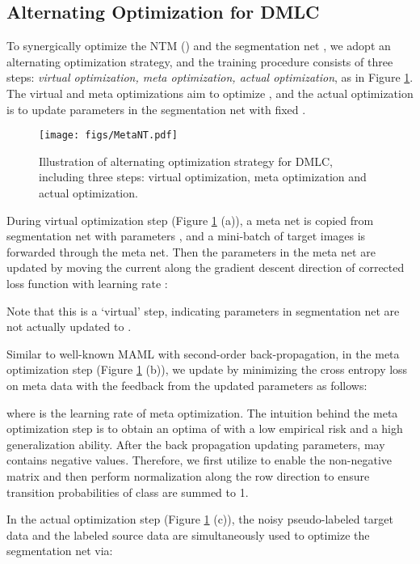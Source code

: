 \documentclass[final]{cvpr}
\begin{document}
\subsection{Alternating Optimization for DMLC}
To synergically optimize the NTM () and the segmentation net , we adopt an alternating optimization strategy, and the training procedure consists of three steps: \textit{virtual optimization, meta optimization, actual optimization}, as in Figure \ref{fig:MetaNT}. The virtual and meta optimizations aim to optimize , and the actual optimization is to update parameters in the segmentation net with fixed . 

\begin{figure}[t]
\centering
\texttt{[image: figs/MetaNT.pdf]}
\caption{Illustration of alternating optimization strategy for DMLC, including three steps: virtual optimization, meta optimization and actual optimization. }
\label{fig:MetaNT}
\vspace{-0.2cm}
\end{figure}

During virtual optimization step (Figure \ref{fig:MetaNT} (a)), a meta net is copied from segmentation net with parameters , and a mini-batch of target images is forwarded  through the meta net. Then the parameters in the meta net are updated by moving the current  along the gradient descent direction of corrected loss function with learning rate : 
\vspace{-0.1cm}

Note that this is a `virtual' step, indicating parameters in segmentation net are not actually updated to .

Similar to well-known MAML \cite{finn2017model} with second-order back-propagation, in the meta optimization step (Figure \ref{fig:MetaNT} (b)), we update  by minimizing the  cross entropy loss on meta data with the feedback from the updated parameters  as follows: 
\vspace{-0.1cm}

where  is the learning rate of meta optimization. The intuition behind the meta optimization step is to obtain an optima of  with a low empirical risk and a high generalization ability. After the back propagation updating parameters,  may contains negative values. Therefore, we first utilize  to enable the non-negative matrix and then perform normalization along the row direction  to ensure transition probabilities of class  are summed to 1.

In the actual optimization step (Figure \ref{fig:MetaNT} (c)), the noisy pseudo-labeled target data and the labeled source data are simultaneously used to optimize the segmentation net via: 
\end{document}
